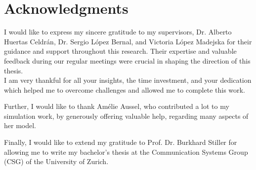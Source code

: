 \chapter*{Acknowledgments}

I would like to express my sincere gratitude to my supervisors, Dr. Alberto Huertas Celdr\'an, Dr. Sergio L\'opez Bernal, and Victoria L\'opez Madejska for their guidance and support throughout this research. Their expertise and valuable feedback during our regular meetings were crucial in shaping the direction of this thesis.\\
I am very thankful for all your insights, the time investment, and your dedication which helped me to overcome challenges and allowed me to complete this work.

Further, I would like to thank Am\'elie Aussel, who contributed a lot to my simulation work, by generously offering valuable help, regarding many aspects of her model.

Finally, I would like to extend my gratitude to Prof. Dr. Burkhard Stiller for allowing me to write my bachelor's thesis at the Communication Systems Group (CSG) of the University of Zurich.

